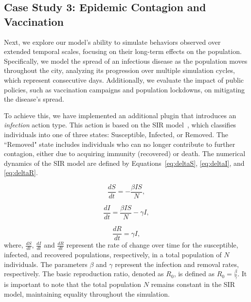 \documentclass[pdflatex,sn-mathphys-num]{sn-jnl}%
\theoremstyle{thmstyleone}%
\theoremstyle{thmstyletwo}%
\theoremstyle{thmstylethree}%
\begin{document}
\subsection{Case Study 3: Epidemic Contagion and Vaccination}
\label{sec:contagion}

Next, we explore our model's ability to simulate behaviors observed over extended temporal scales, focusing on their long-term effects on the population. Specifically, we model the spread of an infectious disease as the population moves throughout the city, analyzing its progression over multiple simulation cycles, which represent consecutive days. Additionally, we evaluate the impact of public policies, such as vaccination campaigns and population lockdowns, on mitigating the disease's spread.

To achieve this, we have implemented an additional plugin that introduces an \textit{infection} action type. This action is based on the SIR model~\citep{kermack1927contribution}, which classifies individuals into one of three states: Susceptible, Infected, or Removed. The ``Removed" state includes individuals who can no longer contribute to further contagion, either due to acquiring immunity (recovered) or death. The numerical dynamics of the SIR model are defined by Equations~\ref{eq:deltaS}, \ref{eq:deltaI}, and \ref{eq:deltaR}.

\begin{equation}
\label{eq:deltaS}
   { \frac{dS}{dt} } =- { \frac{\beta I S}{N} },
\end{equation}

\begin{equation}
\label{eq:deltaI}
   { \frac{dI}{dt} } = { \frac{\beta I S}{N} } - {\gamma I},
\end{equation}

\begin{equation}
\label{eq:deltaR}
   { \frac{dR}{dt} } = {\gamma I},
\end{equation}
where, $\frac{dS}{dt}$, $\frac{dI}{dt}$ and $\frac{dR}{dt}$ represent the rate of change over time for the susceptible, infected, and recovered populations, respectively, in a total population of $N$ individuals. The parameters $\beta$ and $\gamma$ represent the infection and removal rates, respectively. The basic reproduction ratio, denoted as $R_0$, is defined as $R_0 = {\frac{\beta}{\gamma}}$. It is important to note that the total population $N$ remains constant in the SIR model, maintaining equality throughout the simulation.
\end{document}
